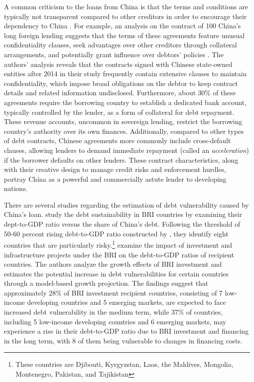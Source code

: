 A common criticism to the loans from China is that the terms and conditions are typically not transparent compared to other creditors in order to encourage their dependency to China \citep{tillerson2018us}. For example,
an analysis on the contract of 100 China's long foreign lending suggests that the terms of these agreements feature unusual confidentiality clauses, seek advantages over other creditors through collateral arrangements, and potentially grant influence over debtors' policies \citep{Gelpern-22}.
The authors' analysis reveals that the contracts signed with Chinese state-owned entities after 2014 in their study frequently contain extensive clauses to maintain confidentiality, which impose broad obligations on the debtor to keep contract details and related information undisclosed. Furthermore, about 30\% of these agreements require the borrowing country to establish a dedicated bank account, typically controlled by the lender, as a form of collateral for debt repayment. These revenue accounts, uncommon in sovereign lending, restrict the borrowing country's authority over its own finances. Additionally, compared to other types of debt contracts, Chinese agreements more commonly include cross-default clauses, allowing lenders to demand immediate repayment (called an \emph{acceleration}) if the borrower defaults on other lenders.
These contract characteristics, along with their creative design to manage credit risks and enforcement hurdles, portray China as a powerful and commercially astute lender to developing nations.

There are several studies regarding the estimation of debt vulnerability caused by China's loan. \citet*{Hurley19-8-debt-trap} study the debt sustainability in BRI countries by examining their dept-to-GDP ratio versus the share of China's debt. Following the threshold of 50-60 percent rising debt-to-GDP ratio constructed by \citet{Chudik-15}, they identify eight
countries that are particularly risky.\footnote{
    These countries are Djibouti, Kyrgyzstan, Laos, the Maldives, Mongolia, Montenegro, Pakistan, and Tajikistan}
\citet*{Bandiera-Vasileios-BRI-debt} examine the impact of investment and infrastructure projects under the BRI on the debt-to-GDP ratios of recipient countries. The authors analyze the growth effects of BRI investment and estimates the potential increase in debt vulnerabilities for certain countries through a model-based growth projection. The findings suggest that approximately 28\% of BRI investment recipient countries, consisting of 7 low-income developing countries and 5 emerging markets, are expected to face increased debt vulnerability in the medium term, while 37\% of countries, including 5 low-income developing countries and 6 emerging markets, may experience a rise in their debt-to-GDP ratio due to BRI investment and financing in the long term, with 8 of them being vulnerable to changes in financing costs.


